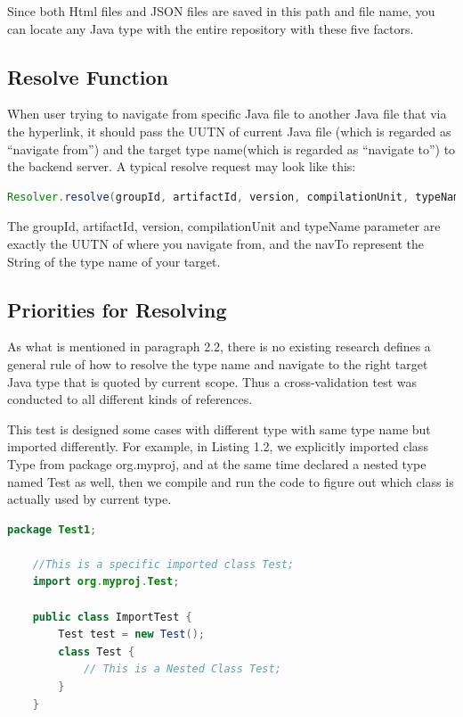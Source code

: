 \documentclass[runningheads]{llncs}
\begin{document}
Since both Html files and JSON files are saved in this path and file name, you can locate any Java type with the entire repository with these five factors.

\subsection{Resolve Function}
When user trying to navigate from specific Java file to another Java file that via the hyperlink, it should pass the UUTN of current Java file (which is regarded as “navigate from”) and the target type name(which is regarded as “navigate to”) to the backend server. A typical resolve request may look like this:

\begin{lstlisting}[language=Java, caption=Resolver example]
Resolver.resolve(groupId, artifactId, version, compilationUnit, typeName, navTo){/*...*/}
\end{lstlisting}

The groupId, artifactId, version, compilationUnit and typeName parameter are exactly the UUTN of where you navigate from, and the navTo represent the String of the type name of your target.

\subsection{Priorities for Resolving}

As what is mentioned in paragraph 2.2, there is no existing research defines a general rule of how to resolve the type name and navigate to the right target Java type that is quoted by current scope. Thus a cross-validation test was conducted to all different kinds of references.

This test is designed some cases with different type with same type name but imported differently. For example, in Listing 1.2, we explicitly imported class Type from package org.myproj, and at the same time declared a nested type named Test as well, then we compile and run the code to figure out which class is actually used by current type. 

\begin{lstlisting}[language=Java, caption=Sample code to show the complexity of Java]
	package Test1;

	//This is a specific imported class Test;
	import org.myproj.Test;
	
	public class ImportTest {
		Test test = new Test();
		class Test {
			// This is a Nested Class Test;
		}
	}
\end{lstlisting}
\end{document}
